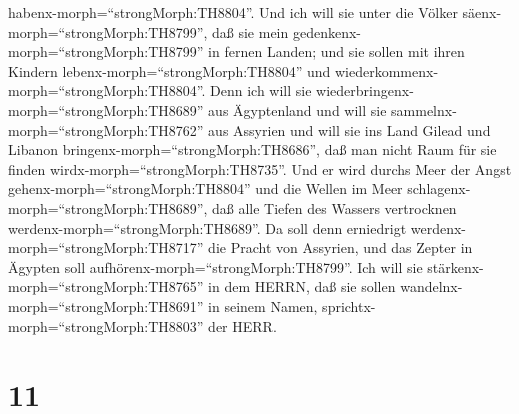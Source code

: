habenx-morph=``strongMorph:TH8804''.  Und ich will sie unter
die Völker säenx-morph=``strongMorph:TH8799'', daß sie mein
gedenkenx-morph=``strongMorph:TH8799'' in fernen Landen; und sie sollen
mit ihren Kindern lebenx-morph=``strongMorph:TH8804'' und
wiederkommenx-morph=``strongMorph:TH8804''.  Denn ich will
sie wiederbringenx-morph=``strongMorph:TH8689'' aus Ägyptenland und will
sie sammelnx-morph=``strongMorph:TH8762'' aus Assyrien und will sie ins
Land Gilead und Libanon bringenx-morph=``strongMorph:TH8686'', daß man
nicht Raum für sie finden wirdx-morph=``strongMorph:TH8735''.
 Und er wird durchs Meer der Angst
gehenx-morph=``strongMorph:TH8804'' und die Wellen im Meer
schlagenx-morph=``strongMorph:TH8689'', daß alle Tiefen des Wassers
vertrocknen werdenx-morph=``strongMorph:TH8689''. Da soll denn
erniedrigt werdenx-morph=``strongMorph:TH8717'' die Pracht von Assyrien,
und das Zepter in Ägypten soll aufhörenx-morph=``strongMorph:TH8799''.
 Ich will sie stärkenx-morph=``strongMorph:TH8765'' in dem
HERRN, daß sie sollen wandelnx-morph=``strongMorph:TH8691'' in seinem
Namen, sprichtx-morph=``strongMorph:TH8803'' der HERR.

\hypertarget{section-10}{%
\section{11}\label{section-10}}

